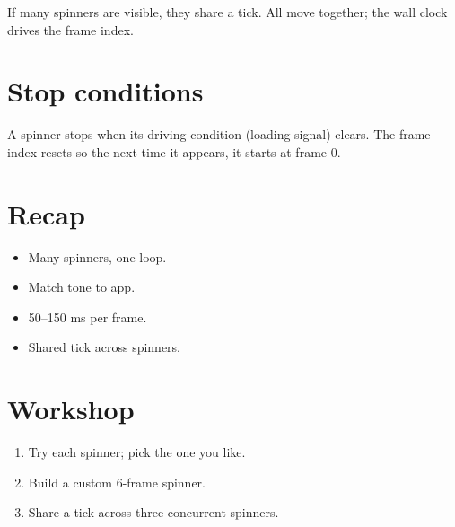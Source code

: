If many spinners are visible, they share a tick. All move
together; the wall clock drives the frame index.

\section{Stop conditions}

A spinner stops when its driving condition (loading
signal) clears. The frame index resets so the next time
it appears, it starts at frame 0.

\section{Recap}

\begin{recap}
\begin{itemize}[leftmargin=*]
  \item Many spinners, one loop.
  \item Match tone to app.
  \item 50--150 ms per frame.
  \item Shared tick across spinners.
\end{itemize}
\end{recap}

\section*{Workshop}

\begin{enumerate}[leftmargin=*]
  \item Try each spinner; pick the one you like.
  \item Build a custom 6-frame spinner.
  \item Share a tick across three concurrent spinners.
\end{enumerate}
